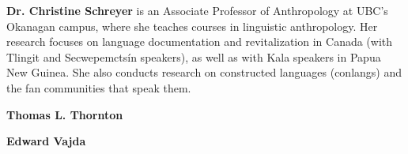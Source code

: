 {\textbf{Dr. Christine Schreyer} is an Associate Professor of Anthropology at UBC’s Okanagan campus, where she teaches courses in linguistic anthropology. Her research focuses on language documentation and revitalization in Canada (with Tlingit and Secwepemctsín speakers), as well as with Kala speakers in Papua New Guinea. She also conducts research on constructed languages (conlangs) and the fan communities that speak them.

\textbf{Thomas L. Thornton}

\textbf{Edward Vajda}

}

